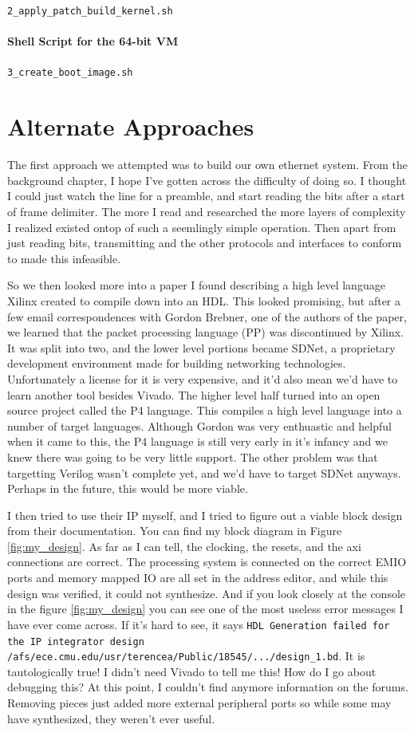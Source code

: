 \documentclass[12pt]{report}
\begin{document}
\texttt{2\_apply\_patch\_build\_kernel.sh}


\subsubsection{Shell Script for the 64-bit VM}
\texttt{3\_create\_boot\_image.sh}

\chapter{Alternate Approaches}
The first approach we attempted was to build our own ethernet system. From the background chapter, I hope I've gotten across the difficulty of doing so. I thought I could just watch the line for a preamble, and start reading the bits after a start of frame delimiter. The more I read and researched the more layers of complexity I realized existed ontop of such a seemlingly simple operation. Then apart from just reading bits, transmitting and the other protocols and interfaces to conform to made this infeasible.

So we then looked more into a paper \cite{pp} I found describing a high level language Xilinx created to compile down into an HDL. This looked promising, but after a few email correspondences with Gordon Brebner, one of the authors of the paper, we learned that the packet processing language (PP) was discontinued by Xilinx. It was split into two, and the lower level portions became SDNet, a proprietary development environment made for building networking technologies. Unfortunately a license for it is very expensive, and it'd also mean we'd have to learn another tool besides Vivado.
The higher level half turned into an open source project called the P4 language.
This compiles a high level language into a number of target languages. Although Gordon was very enthuastic and helpful when it came to this, the P4 language is still very early in it's infancy and we knew there was going to be very little support. The other problem was that targetting Verilog wasn't complete yet, and we'd have to target SDNet anyways. Perhaps in the future, this would be more viable.

I then tried to use their IP myself, and I tried to figure out a viable block design from their documentation. You can find my block diagram in Figure \ref{fig:my_design}.
As far as I can tell, the clocking, the resets, and the axi connections are correct.
The processing system is connected on the correct EMIO ports and memory mapped IO are all set in the address editor, and while this design was verified, it could not synthesize.
And if you look closely at the console in the figure \ref{fig:my_design} you can see one of the most useless error messages I have ever come across.
If it's hard to see, it says \texttt{HDL Generation failed for the IP integrator design /afs/ece.cmu.edu/usr/terencea/Public/18545/.../design\_1.bd}.
It is tautologically true! I didn't need Vivado to tell me this! How do I go about debugging this?
At this point, I couldn't find anymore information on the forums.
Removing pieces just added more external peripheral ports so while some may have synthesized,
they weren't ever useful.
\end{document}
